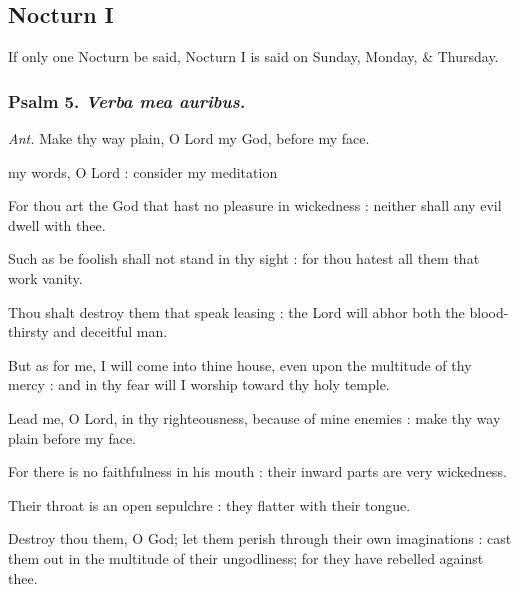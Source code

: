 \vspace{-1ex}

\subsection{Nocturn I}\par
\begin{rubric}
    {If only one Nocturn be said, Nocturn I is said on Sunday, Monday, \& Thursday.}
\end{rubric}

\vspace{-1ex}

\subsubsection{Psalm 5. \textit{Verba mea auribus.}}\par\noindent
\textit{Ant.} Make thy way plain, {\dag} O Lord my God, before my face.\par
{} my words, O Lord : consider my meditation\par
{}
For thou art the God that hast no pleasure in wickedness : neither shall any evil dwell with thee.\par
{}Such as be foolish shall not stand in thy sight : for thou hatest all them that work vanity.\par
{}Thou shalt destroy them that speak leasing : the Lord will abhor both the blood-thirsty and deceitful man.\par
{}But as for me, I will come into thine house, even upon the multitude of thy mercy : and in thy fear will I worship toward thy holy temple.\par
{}Lead me, O Lord, in thy righteousness, because of mine enemies : make thy way plain before my face.\par
{}For there is no faithfulness in his mouth : their inward parts are very wickedness.\par
{}Their throat is an open sepulchre : they flatter with their tongue.\par
{}Destroy thou them, O God; let them perish through their own imaginations : cast them out in the multitude of their ungodliness; for they have rebelled against thee.\par
